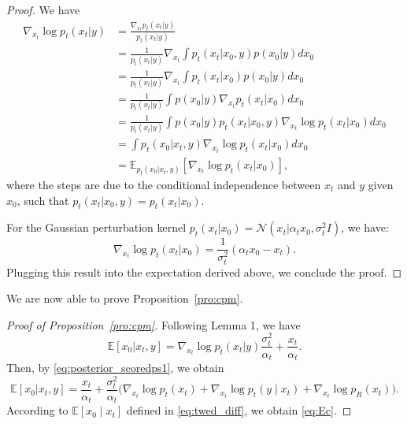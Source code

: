 \documentclass[a4paper,11pt]{article}
\theoremstyle{definition}
\theoremstyle{plain}
\theoremstyle{remark}
\begin{document}
	\begin{proof}
    We have
		\begin{align}
			\nabla_{x_t} \log p_t(x_t|y) &= \frac{\nabla_{x_t} p_t(x_t|y)}{p_t(x_t|y)} \\
			&= \frac{1}{p_t(x_t|y)} \nabla_{x_t} \int p_t(x_t|x_0, y) p(x_0|y) dx_0 \\
			&= \frac{1}{p_t(x_t|y)} \nabla_{x_t} \int p_t(x_t|x_0) p(x_0|y) dx_0 \\
			&= \frac{1}{p_t(x_t|y)} \int p(x_0|y) \nabla_{x_t} p_t(x_t|x_0) dx_0 \\
			&= \frac{1}{p_t(x_t|y)} \int p(x_0|y) p_t(x_t|x_0, y) \nabla_{x_t} \log p_t(x_t|x_0) dx_0 \\
			&= \int p_t(x_0|x_t, y) \nabla_{x_t} \log p_t(x_t|x_0) dx_0 \\
			&= \mathbb{E}_{p_t(x_0|x_t, y)}[\nabla_{x_t} \log p_t(x_t|x_0)],
		\end{align}
		where the steps  are due to the conditional independence between $x_t$ and $y$ given $x_0$, such that $p_t(x_t|x_0, y) = p_t(x_t|x_0)$. 
		
		For the Gaussian perturbation kernel $p_t(x_t|x_0) = \mathcal{N}(x_t|\alpha_t x_0, \sigma_t^2 I)$, we have:
		\begin{equation}
			\nabla_{x_t} \log p_t(x_t|x_0) = \frac{1}{ \sigma_t^2}(\alpha_t x_0 - x_t).
		\end{equation}
		Plugging this result into the expectation derived above, we conclude the proof.
	\end{proof}		

We are now able to prove Proposition~\ref{pro:cpm}.
    \begin{proof}[Proof of Proposition~\ref{pro:cpm}]
		Following Lemma 1, we have 
		\begin{equation}
			\label{eq:E}
		\mathbb{E}[x_0|x_t, y] = 	\nabla_{x_t} \log p_t(x_t|y) \frac{\sigma_t^2}{\alpha_t}  + \frac{x_t}{\alpha_t}.
		\end{equation}
		Then, by \eqref{eq:posterior_scoredps1}, we obtain
		\begin{equation}
			\mathbb{E}[x_0|x_t, y] = \frac{x_t}{\alpha_t} + \frac{\sigma_t^2}{\alpha_t}\Big(	\nabla_{x_t} \log p_t(x_t)
			+
			\nabla_{x_t} \log p_t(y \mid x_t)
			+
			\nabla_{x_t}  \log p_R(x_t)\Big) .
		\end{equation}
		According to $\mathbb{E}[x_0 \mid x_t] $ defined in \eqref{eq:twed_diff}, we obtain \eqref{eq:Ec}.
\end{proof}



\end{document}
